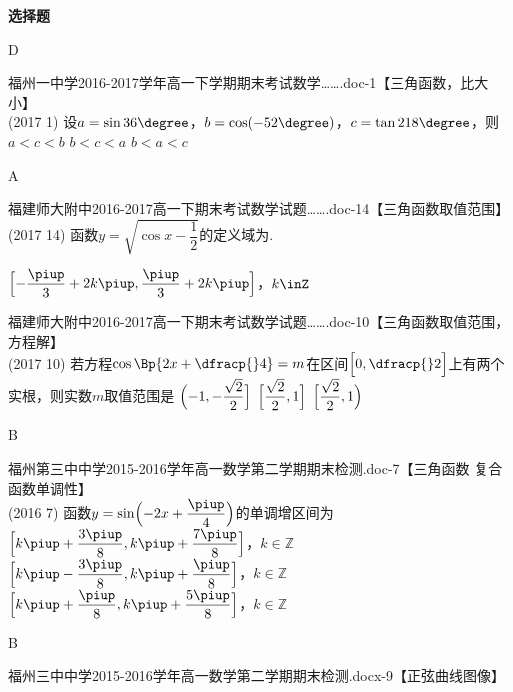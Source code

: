 \begin{exercise}{\bf 选择题}
      \begin{answer}
        D
      \end{answer}
    \item 福州一中学2016-2017学年高一下学期期末考试数学…….doc-1【三角函数，比大小】\\
      (2017  1)
      设$a=\sin36\degree$，$b=\cos(-52\degree)$，$c=\tan218\degree$，则\xz
       {$a<c<b$}
       {$b<c<a$}
       {$b<a<c$}
      \begin{answer}
        A
      \end{answer}
    \item 福建师大附中2016-2017高一下期末考试数学试题…….doc-14【三角函数取值范围】\\
      (2017  14)
      函数$y=\sqrt{\cos x-\dfrac12}$的定义域为\tk.
      \begin{answer}
        $\Bigl[-\dfrac{\piup}3+2k\piup,\dfrac{\piup}3+2k\piup\Bigr]$，$k\inZ$
      \end{answer}
    \item 福建师大附中2016-2017高一下期末考试数学试题…….doc-10【三角函数取值范围，方程解】\\
      (2017  10)
      若方程$\cos\Bp{2x+\dfracp{}4}=m$在区间$\Bigl[0,\dfracp{}2\Bigr]$上有两个实根，则实数$m$取值范围是\xz
       {$\Bigl(-1,-\dfrac{\sqrt2}2\Bigr]$}
       {$\Bigl[\dfrac{\sqrt2}2,1\Bigr]$}
       {$\Bigl[\dfrac{\sqrt2}2,1\Bigr)$}
      \begin{answer}
        B
      \end{answer}
    \item 福州第三中中学2015-2016学年高一数学第二学期期末检测.doc-7【三角函数 复合函数单调性】\\
      (2016  7)
      函数$y=\sin\Bigl(-2x+\dfrac{\piup}4 \Bigr)$的单调增区间为\xz
       {$\Bigl[k\piup+\dfrac{3\piup}8,k\piup+\dfrac{7\piup}8 \Bigr]$，$k\in\mathbb{Z}$}
       {$\Bigl[k\piup-\dfrac{3\piup}8,k\piup+\dfrac{\piup}8 \Bigr]$，$k\in\mathbb{Z}$}
       {$\Bigl[k\piup+\dfrac{\piup}8,k\piup+\dfrac{5\piup}8 \Bigr]$，$k\in\mathbb{Z}$}
      \begin{answer}
        B
      \end{answer}
    \item 福州三中中学2015-2016学年高一数学第二学期期末检测.docx-9【正弦曲线图像】\\

\end{exercise}
